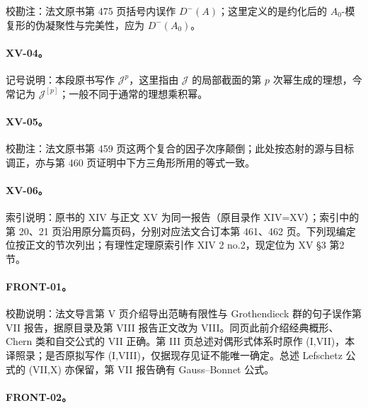 校勘注：法文原书第 475 页括号内误作 $D^-(A)$；这里定义的是约化后的 $A_0$-模复形的伪凝聚性与完美性，应为 $D^-(A_0)$。

\hypertarget{collation-XV-04}{}

\paragraph*{XV-04。}

记号说明：本段原书写作 $\mathcal J^p$，这里指由 $\mathcal J$ 的局部截面的第 $p$ 次幂生成的理想，今常记为 $\mathcal J^{[p]}$；一般不同于通常的理想乘积幂。

\hypertarget{collation-XV-05}{}

\paragraph*{XV-05。}

校勘注：法文原书第 459 页这两个复合的因子次序颠倒；此处按态射的源与目标调正，亦与第 460 页证明中下方三角形所用的等式一致。

\hypertarget{collation-XV-06}{}

\paragraph*{XV-06。}

索引说明：原书的 XIV 与正文 XV 为同一报告（原目录作 XIV=XV）；索引中的第 20、21 页沿用原分篇页码，分别对应法文合订本第 461、462 页。下列现编定位按正文的节次列出；有理性定理原索引作 XIV 2 no.2，现定位为 XV §3 第2节。

\hypertarget{collation-FRONT-01}{}

\paragraph*{FRONT-01。}

校勘说明：法文导言第 V 页介绍导出范畴有限性与 Grothendieck 群的句子误作第 VII 报告，据原目录及第 VIII 报告正文改为 VIII。同页此前介绍经典概形、Chern 类和自交公式的 VII 正确。第 III 页总述对偶形式体系时原作 (I,VII)，本译照录；是否原拟写作 (I,VIII)，仅据现存见证不能唯一确定。总述 Lefschetz 公式的 (VII,X) 亦保留，第 VII 报告确有 Gauss--Bonnet 公式。

\hypertarget{collation-FRONT-02}{}

\paragraph*{FRONT-02。}

